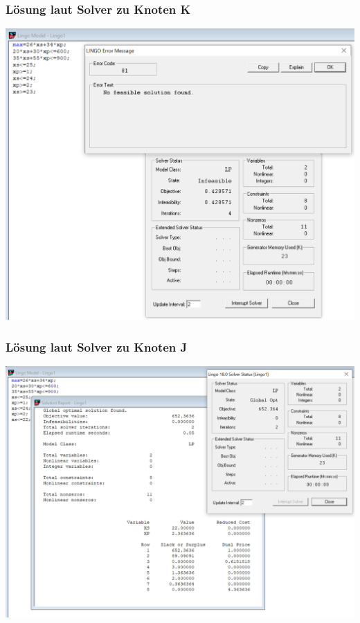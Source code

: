 \documentclass[a4paper,11pt]{article}
\begin{document}
\subsubsection*{Lösung laut Solver zu Knoten K}
\begin{centering}
	\includegraphics[width=0.65\linewidth]{src/blatt_5_aufgabe_2_teilaufgabe_c_knoten_k_loesung_solver.png}
\end{centering}

\subsubsection*{Lösung laut Solver zu Knoten J}
\begin{centering}
	\includegraphics[width=0.65\linewidth]{src/blatt_5_aufgabe_2_teilaufgabe_c_knoten_j_loesung_solver.png}
\end{centering}
\end{document}
